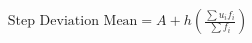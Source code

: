 \documentclass[preview]{standalone}
\begin{document}
\begin{align*}
\text{Step Deviation Mean} = A + h \left( \frac{\sum u_i f_i}{\sum f_i} \right)
\end{align*}
\end{document}
